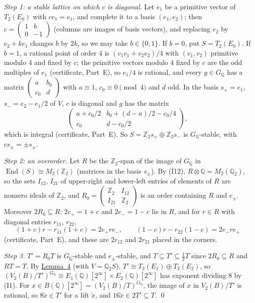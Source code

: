 \documentclass[11pt]{article}
\newcommand{\Q}{\mathbb Q}
\newcommand{\Z}{\mathbb Z}
\DeclareMathOperator{\End}{End}
\begin{document}
\emph{Step 1: a stable lattice on which \(c\) is diagonal.} Let \(e_1\) be a primitive vector of \(T_2(E_0)\) with
\(ce_1=e_1\), and complete it to a basis \((e_1,e_2)\); then \(c=\left(\begin{smallmatrix}1&b\\0&-1
\end{smallmatrix}\right)\) (columns are images of basis vectors), and replacing \(e_2\) by \(e_2+ke_1\) changes \(b\)
by \(2k\), so we may take \(b\in\{0,1\}\). If \(b=0\), put \(S=T_2(E_0)\). If \(b=1\), a rational point of order
\(4\) is \((v_1e_1+v_2e_2)/4\) with \((v_1,v_2)\) primitive modulo \(4\) and fixed by \(c\); the primitive vectors
modulo \(4\) fixed by \(c\) are the odd multiples of \(e_1\) (certificate, Part~E), so \(e_1/4\) is rational, and
every \(g\in G_{\Q}\) has a matrix \(\left(\begin{smallmatrix}a&b_0\\c_0&d\end{smallmatrix}\right)\) with
\(a\equiv1\), \(c_0\equiv0\pmod4\) and \(d\) odd. In the basis \(s_{+}=e_1\), \(s_{-}=e_2-e_1/2\) of \(V\), \(c\) is
diagonal and \(g\) has the matrix
\[\begin{pmatrix}a+c_0/2&b_0+(d-a)/2-c_0/4\\ c_0&d-c_0/2\end{pmatrix},\]
which is integral (certificate, Part~E). So \(S=\Z_2s_{+}\oplus\Z_2s_{-}\) is \(G_{\Q}\)-stable, with \(cs_\pm=\pm
s_\pm\).

\emph{Step 2: an overorder.} Let \(R\) be the \(\Z_2\)-span of the image of \(G_{\Q}\) in \(\End(S)\cong M_2(\Z_2)\)
(matrices in the basis \(s_\pm\)). By (I12), \(R\otimes\Q=M_2(\Q_2)\), so the sets \(I_{12}\), \(I_{21}\) of
upper-right and lower-left entries of elements of \(R\) are nonzero ideals of \(\Z_2\), and
\(R_0=\left(\begin{smallmatrix}\Z_2&I_{12}\\ I_{21}&\Z_2\end{smallmatrix}\right)\) is an order containing \(R\)
and \(e_\pm\). Moreover \(2R_0\subseteq R\): \(2e_{+}=1+c\) and \(2e_{-}=1-c\) lie in \(R\), and for \(r\in R\) with
diagonal entries \(r_{11}\), \(r_{22}\),
\[(1+c)r-r_{11}(1+c)=2e_{+}re_{-},\qquad (1-c)r-r_{22}(1-c)=2e_{-}re_{+}\]
(certificate, Part~E), and these are \(2r_{12}\) and \(2r_{21}\) placed in the corners.

\emph{Step 3.} \(T'=R_0T\) is \(G_{\Q}\)-stable and \(e_\pm\)-stable, and \(T\subseteq T'\subseteq\tfrac12T\) since
\(2R_0\subseteq R\) and \(RT=T\). By \hyperref[lemma-lattices]{Lemma~4} (with \(V=\Q_2S\)), \(T'\cong
T_2(E_1)\oplus T_2(E_2)\), so \((V_2(B)/T')^{G_{\Q}}\cong E_1(\Q)[2^\infty]\times E_2(\Q)[2^\infty]\) has exponent
dividing \(8\) by (I1). For \(x\in B(\Q)[2^\infty]=(V_2(B)/T)^{G_{\Q}}\), the image of \(x\) in \(V_2(B)/T'\) is
rational, so \(8\tilde x\in T'\) for a lift \(\tilde x\), and \(16\tilde x\in2T'\subseteq T\). \qed
\end{document}
